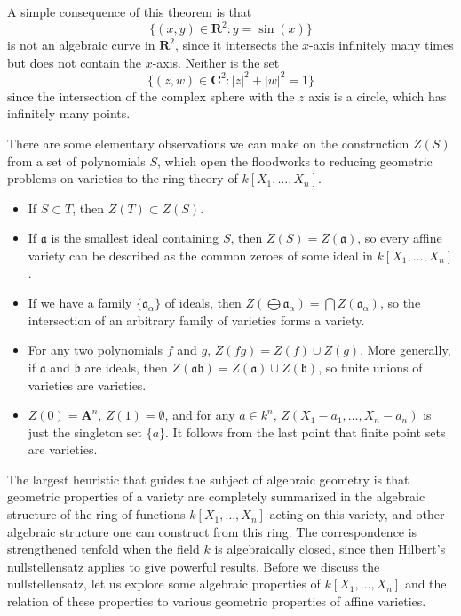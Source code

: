 \begin{remark}
    A simple consequence of this theorem is that
    \[ \{ (x,y) \in \mathbf{R}^2 : y = \sin(x) \} \]
    is not an algebraic curve in $\mathbf{R}^2$, since it intersects the $x$-axis infinitely many times but does not contain the $x$-axis. Neither is the set
    \[ \{ (z,w) \in \mathbf{C}^2 : |z|^2 + |w|^2 = 1 \} \]
    since the intersection of the complex sphere with the $z$ axis is a circle, which has infinitely many points.
\end{remark}

There are some elementary observations we can make on the construction $Z(S)$ from a set of polynomials $S$, which open the floodworks to reducing geometric problems on varieties to the ring theory of $k[X_1, \dots, X_n]$.
%
\begin{itemize}
    \item If $S \subset T$, then $Z(T) \subset Z(S)$.

    \item If $\mathfrak{a}$ is the smallest ideal containing $S$, then $Z(S) = Z(\mathfrak{a})$, so every affine variety can be described as the common zeroes of some ideal in $k[X_1,\dots,X_n]$.

    \item If we have a family $\{ \mathfrak{a}_\alpha \}$ of ideals, then $Z(\bigoplus \mathfrak{a}_\alpha) = \bigcap Z(\mathfrak{a}_\alpha)$, so the intersection of an arbitrary family of varieties forms a variety.

    \item For any two polynomials $f$ and $g$, $Z(fg) = Z(f) \cup Z(g)$. More generally, if $\mathfrak{a}$ and $\mathfrak{b}$ are ideals, then $Z(\mathfrak{a}\mathfrak{b}) = Z(\mathfrak{a}) \cup Z(\mathfrak{b})$, so finite unions of varieties are varieties.

    \item $Z(0) = \mathbf{A}^n$, $Z(1) = \emptyset$, and for any $a \in k^n$, $Z(X_1-a_1,\dots,X_n - a_n)$ is just the singleton set $\{ a \}$. It follows from the last point that finite point sets are varieties.
\end{itemize}
%
The largest heuristic that guides the subject of algebraic geometry is that geometric properties of a variety are completely summarized in the algebraic structure of the ring of functions $k[X_1,\dots,X_n]$ acting on this variety, and other algebraic structure one can construct from this ring. The correspondence is strengthened tenfold when the field $k$ is algebraically closed, since then Hilbert's nullstellensatz applies to give powerful results. Before we discuss the nullstellensatz, let us explore some algebraic properties of $k[X_1,\dots,X_n]$ and the relation of these properties to various geometric properties of affine varieties.

